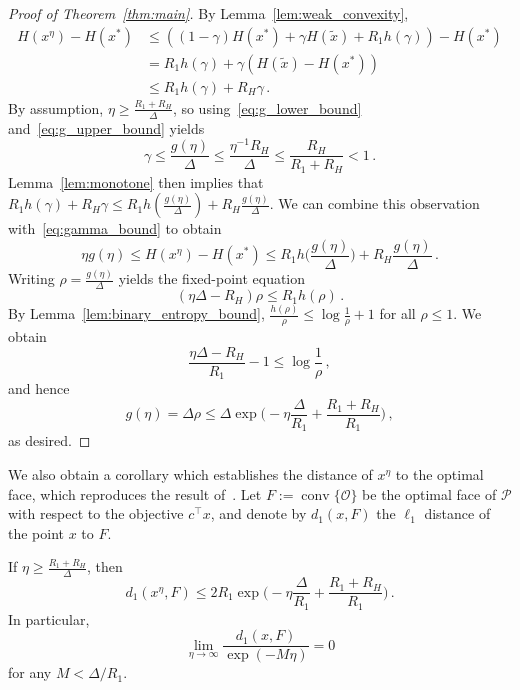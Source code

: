 \documentclass[final,12pt]{colt2018}
\newcommand{\cO}{\mathcal{O}}
\newcommand{\cP}{\mathcal{P}}
\newcommand{\1}{\mathds{1}}
\DeclareMathOperator*{\conv}{conv}
\newcommand*{\ent}[1]{H(#1)}
\begin{document}
\begin{proof}[Proof of Theorem~\ref{thm:main}]
By Lemma~\ref{lem:weak_convexity},
\begin{align}
\ent{x^\eta} - \ent{x^*} & \leq \left((1-\gamma) \ent{x^*} + \gamma \ent{\tilde x} + R_1 h(\gamma)\right) - \ent{x^*} \nonumber \\
& = R_1 h(\gamma) + \gamma(\ent{\tilde x} - \ent{x^*}) \nonumber \\
& \leq R_1 h(\gamma) + R_H \gamma\,. \label{eq:gamma_bound}
\end{align}
By assumption, $\eta \geq \frac{R_1 + R_H}{\Delta}$, so using~\eqref{eq:g_lower_bound} and~\eqref{eq:g_upper_bound} yields
\begin{equation*}
\gamma \leq \frac{g(\eta)}{\Delta} \leq \frac{\eta^{-1} R_H}{\Delta} \leq \frac{R_H}{R_1 + R_H} < 1\,.
\end{equation*}
Lemma~\ref{lem:monotone} then implies that $R_1 h(\gamma) + R_H \gamma \leq R_1 h\left(\frac{g(\eta)}{\Delta}\right) + R_H\frac{g(\eta)}{\Delta}$.
We can combine this observation with~\eqref{eq:gamma_bound} to obtain
\begin{equation*}
\eta g(\eta) \leq \ent{x^\eta} - \ent{x^*} \leq R_1 h\Big(\frac{g(\eta)}{\Delta}\Big) + R_H \frac{g(\eta)}{\Delta}\,.
\end{equation*}
Writing $\rho = \frac{g(\eta)}{\Delta}$ yields the fixed-point equation
\begin{equation*}
(\eta \Delta - R_H) \rho \leq R_1 h(\rho)\,.
\end{equation*}
By Lemma~\ref{lem:binary_entropy_bound}, $\frac{h(\rho)}{\rho} \leq \log \frac 1 \rho + 1$ for all $\rho \leq 1$.
We obtain
\begin{equation*}
\frac{\eta \Delta - R_H}{R_1} - 1 \leq \log \frac 1 \rho\,,
\end{equation*}
and hence
\begin{equation*}
g(\eta) = \Delta \rho \leq \Delta \exp\Big(-\eta\frac{\Delta}{R_1} + \frac{R_1 + R_H}{R_1}\Big)\,,
\end{equation*}
as desired.
\end{proof}
We also obtain a corollary which establishes the distance of $x^\eta$ to the optimal face, which reproduces the result of~\citet{ComSan94}.
Let $F := \conv\{\cO\}$ be the optimal face of $\cP$ with respect to the objective $c^\top x$, and denote by $d_1(x, F)$ the $\ell_1$ distance of the point $x$ to $F$.
\begin{corollary}
If $\eta \geq \frac{R_1 + R_H}{\Delta}$, then
\begin{equation*}
d_1(x^\eta, F) \leq 2 R_1 \exp\Big(-\eta\frac{\Delta}{R_1} + \frac{R_1 + R_H}{R_1}\Big)\,.
\end{equation*}
In particular,
\begin{equation*}
\lim_{\eta \to \infty} \frac{d_1(x, F)}{\exp(-M \eta)} = 0
\end{equation*}
for any $M < \Delta/R_1$.
\end{corollary}
\end{document}
